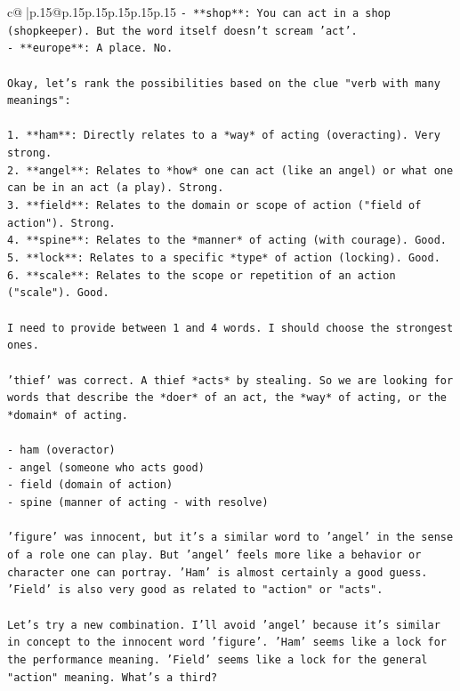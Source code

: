 \documentclass{article}
\begin{document}
{\begin{supertabular}{c@{$\;$}|p{.15\linewidth}@{}p{.15\linewidth}p{.15\linewidth}p{.15\linewidth}p{.15\linewidth}p{.15\linewidth}}
{{{\texttt{{-} **shop**: You can act in a shop (shopkeeper). But the word itself doesn't scream 'act'.} \\
\texttt{{-} **europe**: A place. No.} \\
\\ 
\texttt{Okay, let's rank the possibilities based on the clue "verb with many meanings":} \\
\\ 
\texttt{1.  **ham**: Directly relates to a *way* of acting (overacting). Very strong.} \\
\texttt{2.  **angel**: Relates to *how* one can act (like an angel) or what one can be in an act (a play). Strong.} \\
\texttt{3.  **field**: Relates to the domain or scope of action ("field of action"). Strong.} \\
\texttt{4.  **spine**: Relates to the *manner* of acting (with courage). Good.} \\
\texttt{5.  **lock**: Relates to a specific *type* of action (locking). Good.} \\
\texttt{6.  **scale**: Relates to the scope or repetition of an action ("scale"). Good.} \\
\\ 
\texttt{I need to provide between 1 and 4 words. I should choose the strongest ones.} \\
\\ 
\texttt{'thief' was correct. A thief *acts* by stealing. So we are looking for words that describe the *doer* of an act, the *way* of acting, or the *domain* of acting.} \\
\\ 
\texttt{{-} ham (overactor)} \\
\texttt{{-} angel (someone who acts good)} \\
\texttt{{-} field (domain of action)} \\
\texttt{{-} spine (manner of acting {-} with resolve)} \\
\\ 
\texttt{'figure' was innocent, but it's a similar word to 'angel' in the sense of a role one can play. But 'angel' feels more like a behavior or character one can portray. 'Ham' is almost certainly a good guess. 'Field' is also very good as related to "action" or "acts".} \\
\\ 
\texttt{Let's try a new combination. I'll avoid 'angel' because it's similar in concept to the innocent word 'figure'. 'Ham' seems like a lock for the performance meaning. 'Field' seems like a lock for the general "action" meaning. What's a third?} \\
}}}
\end{supertabular}}
\end{document}
